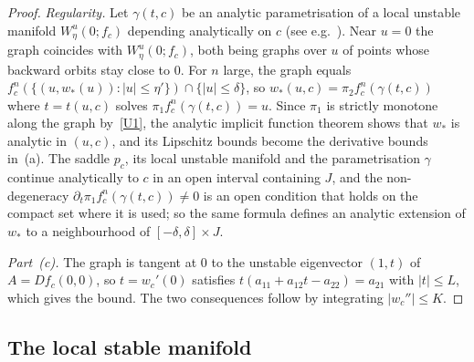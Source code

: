 \documentclass[11pt]{amsart}
\theoremstyle{definition}
\theoremstyle{remark}
\newcommand{\Wu}{W^u}
\begin{document}
\begin{proof}
\emph{Regularity.} Let $\gamma(t,c)$ be an analytic parametrisation of a local unstable manifold
$\Wu_\eta(0;f_c)$ depending analytically on $c$ (see e.g.~\cite{CFdlL03}). Near $u=0$ the graph coincides
with $\Wu_\eta(0;f_c)$, both being graphs over $u$ of points whose backward orbits stay close to $0$. For
$n$ large, the graph equals $f^n_c(\{(u,w_*(u)):|u|\le\eta'\})\cap\{|u|\le\delta\}$, so
$w_*(u,c)=\pi_2f^n_c(\gamma(t,c))$ where $t=t(u,c)$ solves $\pi_1f^n_c(\gamma(t,c))=u$. Since $\pi_1$ is
strictly monotone along the graph by~\ref{U1}, the analytic implicit function theorem shows that $w_*$ is
analytic in $(u,c)$, and its Lipschitz bounds become the derivative bounds in~(a). The saddle $p_c$, its local
unstable manifold and the parametrisation $\gamma$ continue analytically to $c$ in an open interval containing
$J$, and the non-degeneracy $\partial_t\pi_1f^n_c(\gamma(t,c))\neq0$ is an open condition that holds on the
compact set where it is used; so the same formula defines an analytic extension of $w_*$ to a neighbourhood of
$[-\delta,\delta]\times J$.

\emph{Part~(c).} The graph is tangent at $0$ to the unstable eigenvector $(1,t)$ of $A=Df_c(0,0)$, so
$t=w_c'(0)$ satisfies $t(a_{11}+a_{12}t-a_{22})=a_{21}$ with $|t|\le L$, which gives the bound. The two
consequences follow by integrating $|w_c''|\le K$.
\end{proof}

\subsection{The local stable manifold}
\end{document}
